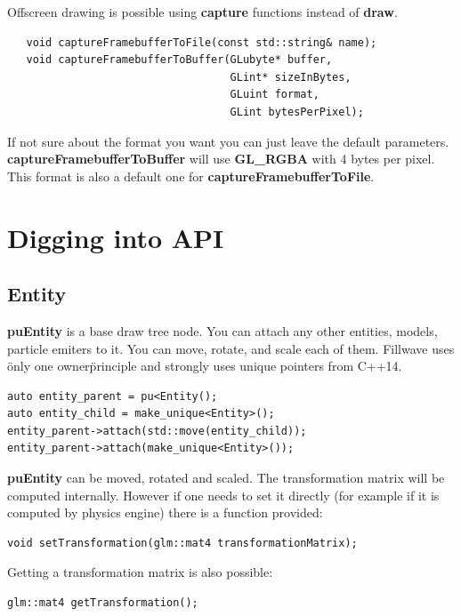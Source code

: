 \documentclass{article}
\begin{document}
\indent Offscreen drawing is possible using \textbf{capture} functions instead of \textbf{draw}.

\begin{lstlisting}
   void captureFramebufferToFile(const std::string& name);
   void captureFramebufferToBuffer(GLubyte* buffer,
                                   GLint* sizeInBytes,
                                   GLuint format,
                                   GLint bytesPerPixel);
\end{lstlisting}
\indent \indent If not sure about the format you want you can just leave the default parameters. \textbf{captureFramebufferToBuffer} will use \textbf{GL\_RGBA} with 4 bytes per pixel. This format is also a default one for \textbf{captureFramebufferToFile}.

\section{Digging into API}

\subsection{Entity}\label{sec:Entity}
\indent \indent \textbf{puEntity} is a base draw tree node. You can attach any other entities, models, particle emiters to it. You can move, rotate, and scale each of them. Fillwave uses \"only one owner\" principle and strongly uses unique pointers from C++14.

\begin{lstlisting}
auto entity_parent = pu<Entity();
auto entity_child = make_unique<Entity>();
entity_parent->attach(std::move(entity_child));
entity_parent->attach(make_unique<Entity>());
\end{lstlisting}

\indent \indent \textbf{puEntity} can be moved, rotated and scaled. The transformation matrix will be computed internally. However if one needs to set it directly (for example if it is computed by physics engine) there is a function provided:

\begin{lstlisting}
void setTransformation(glm::mat4 transformationMatrix);
\end{lstlisting}

\indent \indent Getting a transformation matrix is also possible:

\begin{lstlisting}
glm::mat4 getTransformation();
\end{lstlisting}
\end{document}
